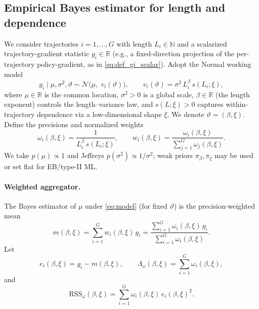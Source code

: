 \subsection{Empirical Bayes estimator for length and dependence}
\label{sec:eb-theory}

\makeatletter
{}
\makeatother
\ifx\proof\undefined
  \newenvironment{proof}{\par\noindent\textit{Proof.}\ }{\hfill$\square$\par}
\fi

We consider trajectories \(i=1,\dots,G\) with length \(L_i\in\mathbb N\) and a scalarized trajectory-gradient statistic \(g_i\in\mathbb R\) (e.g., a fixed-direction projection of the per-trajectory policy-gradient, as in \eqref{eq:def_gi_scalar}).
Adopt the Normal working model
\begin{equation}
\label{eq:model}
g_i \mid \mu,\sigma^2,\vartheta \sim \mathcal N\!\big(\mu,\; v_i(\vartheta)\big),
\qquad
v_i(\vartheta)=\sigma^2\,L_i^{\beta}\,s(L_i;\xi),
\end{equation}
where \(\mu\in\mathbb R\) is the common location, \(\sigma^2>0\) is a global scale,
\(\beta\in\mathbb R\) (the length exponent) controls the length–variance law,
and \(s(L;\xi)>0\) captures within-trajectory dependence via a low-dimensional shape \(\xi\).
We denote \(\vartheta=(\beta,\xi)\).
Define the precisions and normalized weights
\begin{equation}
\label{eq:prec-weights}
\omega_i(\beta,\xi)=\frac{1}{L_i^{\beta}\,s(L_i;\xi)},
\qquad
w_i(\beta,\xi)=\frac{\omega_i(\beta,\xi)}{\sum_{j=1}^G \omega_j(\beta,\xi)}.
\end{equation}
We take \(p(\mu)\propto 1\) and Jeffreys \(p(\sigma^2)\propto 1/\sigma^2\); weak priors \(\pi_{\beta},\pi_{\xi}\) may be used or set flat for EB/type-II ML.

\paragraph{Weighted aggregator.}
The Bayes estimator of \(\mu\) under \eqref{eq:model} (for fixed \(\vartheta\)) is the precision-weighted mean
\begin{equation}
\label{eq:mu-agg}
m(\beta,\xi)=\sum_{i=1}^G w_i(\beta,\xi)\,g_i
=\frac{\sum_{i=1}^G \omega_i(\beta,\xi)\,g_i}{\sum_{i=1}^G \omega_i(\beta,\xi)}.
\end{equation}
Let
\[
e_i(\beta,\xi)=g_i-m(\beta,\xi),
\qquad
\Lambda_\omega(\beta,\xi)=\sum_{i=1}^G \omega_i(\beta,\xi),
\]
and
\begin{equation}
\label{eq:Lambda-RSS}
\mathrm{RSS}_\omega(\beta,\xi)=\sum_{i=1}^G \omega_i(\beta,\xi)\,e_i(\beta,\xi)^2.
\end{equation}

